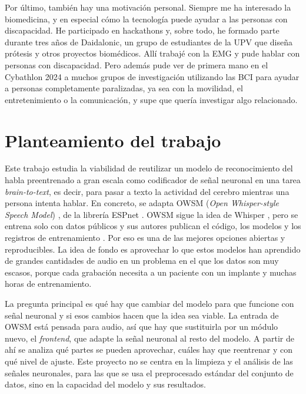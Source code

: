 Por último, también hay una motivación personal. Siempre me ha interesado la biomedicina, y en especial cómo la tecnología puede ayudar a las personas con discapacidad. He participado en hackathons y, sobre todo, he formado parte durante tres años de Daidalonic, un grupo de estudiantes de la UPV que diseña prótesis y otros proyectos biomédicos. Allí trabajé con la EMG y pude hablar con personas con discapacidad. Pero además pude ver de primera mano en el Cybathlon 2024 a muchos grupos de investigación utilizando las BCI para ayudar a personas completamente paralizadas, ya sea con la movilidad, el entretenimiento o la comunicación, y supe que quería investigar algo relacionado.

\section{Planteamiento del trabajo}
\label{sec:planteamiento}

Este trabajo estudia la viabilidad de reutilizar un modelo de reconocimiento del habla preentrenado a gran escala como codificador de señal neuronal en una tarea \textit{brain-to-text}, es decir, para pasar a texto la actividad del cerebro mientras una persona intenta hablar. En concreto, se adapta OWSM (\textit{Open Whisper-style Speech Model}) \cite{peng2023owsm,peng2024owsmv31}, de la librería ESPnet \cite{watanabe2018espnet,someki2024espnetez}. OWSM sigue la idea de Whisper \cite{radford2023whisper}, pero se entrena solo con datos públicos y sus autores publican el código, los modelos y los registros de entrenamiento \cite{peng2024owsmv31}. Por eso es una de las mejores opciones abiertas y reproducibles. La idea de fondo es aprovechar lo que estos modelos han aprendido de grandes cantidades de audio en un problema en el que los datos son muy escasos, porque cada grabación necesita a un paciente con un implante y muchas horas de entrenamiento.

La pregunta principal es qué hay que cambiar del modelo para que funcione con señal neuronal y si esos cambios hacen que la idea sea viable. La entrada de OWSM está pensada para audio, así que hay que sustituirla por un módulo nuevo, el \textit{frontend}, que adapte la señal neuronal al resto del modelo. A partir de ahí se analiza qué partes se pueden aprovechar, cuáles hay que reentrenar y con qué nivel de ajuste. Este proyecto no se centra en la limpieza y el análisis de las señales neuronales, para las que se usa el preprocesado estándar del conjunto de datos, sino en la capacidad del modelo y sus resultados.

